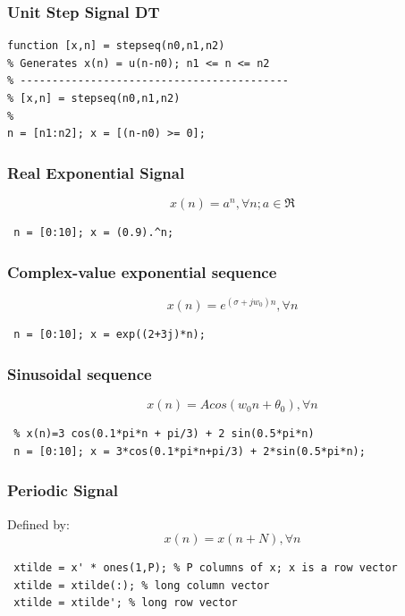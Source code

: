 \documentclass{article}
\begin{document}
\subsubsection{Unit Step Signal DT}
\begin{lstlisting}
function [x,n] = stepseq(n0,n1,n2)
% Generates x(n) = u(n-n0); n1 <= n <= n2
% ------------------------------------------
% [x,n] = stepseq(n0,n1,n2)
%
n = [n1:n2]; x = [(n-n0) >= 0];
\end{lstlisting}

\subsubsection{Real Exponential Signal}
\begin{equation}
x(n) = a^n, \forall n; a\in\Re
\end{equation}
\begin{lstlisting}
 n = [0:10]; x = (0.9).^n;
\end{lstlisting}
\subsubsection{Complex-value exponential sequence}
\begin{equation}
x(n) = e^{(\sigma+jw_0)n}, \forall n
\end{equation}
\begin{lstlisting}
 n = [0:10]; x = exp((2+3j)*n);
\end{lstlisting}
\subsubsection{Sinusoidal sequence}
\begin{equation}
x(n) = Acos(w_0n+\theta_0),\forall n
\end{equation}
\begin{lstlisting}
 % x(n)=3 cos(0.1*pi*n + pi/3) + 2 sin(0.5*pi*n)
 n = [0:10]; x = 3*cos(0.1*pi*n+pi/3) + 2*sin(0.5*pi*n);    
\end{lstlisting}
\subsubsection{Periodic Signal}
Defined by: \begin{equation}
x(n) = x(n+N) , \forall n
\end{equation}
\begin{lstlisting}
 xtilde = x' * ones(1,P); % P columns of x; x is a row vector
 xtilde = xtilde(:); % long column vector
 xtilde = xtilde'; % long row vector
\end{lstlisting}
\end{document}
